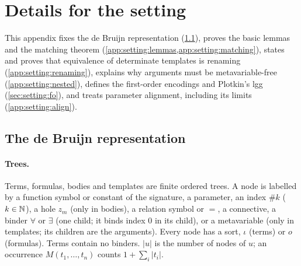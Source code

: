 \section{Details for the setting}\label{app:setting}


This appendix fixes the de Bruijn representation (\cref{app:setting:debruijn}), proves the basic lemmas and the matching theorem (\cref{app:setting:lemmas,app:setting:matching}), states and proves that equivalence of determinate templates is renaming (\cref{app:setting:renaming}), explains why arguments must be metavariable-free (\cref{app:setting:nested}), defines the first-order encodings and Plotkin's lgg (\cref{sec:setting:fo}), and treats parameter alignment, including its limits (\cref{app:setting:align}).

\subsection{The de Bruijn representation}\label{app:setting:debruijn}

\paragraph{Trees.}
Terms, formulas, bodies and templates are finite ordered trees. A node is labelled by a function symbol or constant of the signature, a parameter, an index $\#k$ ($k\in\mathbb{N}$), a hole $z_m$ (only in bodies), a relation symbol or $=$, a connective, a binder $\forall$ or $\exists$ (one child; it binds index $0$ in its child), or a metavariable (only in templates; its children are the arguments). Every node has a sort, $\iota$ (terms) or $o$ (formulas). Terms contain no binders. $|u|$ is the number of nodes of $u$; an occurrence $M(t_1,\dots,t_n)$ counts $1+\sum_i|t_i|$.

